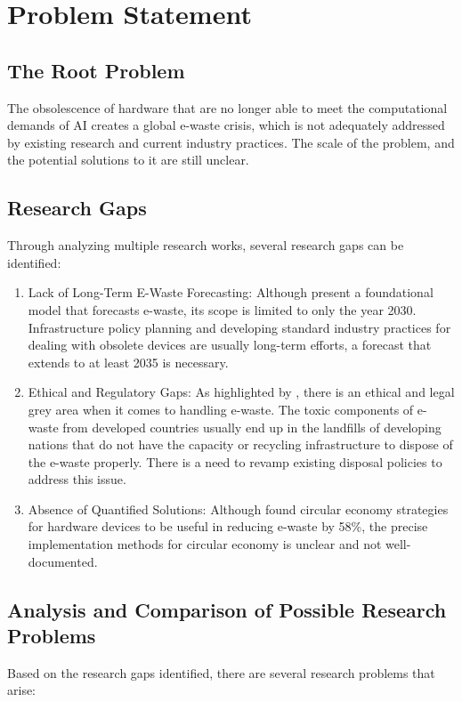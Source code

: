 \documentclass[a4paper, 12pt]{article}
\begin{document}
\section{Problem Statement}
\subsection*{The Root Problem}
The obsolescence of hardware that are no longer able to meet the computational demands of AI creates a global e-waste crisis, which is not adequately addressed by existing research and current industry practices. The scale of the problem, and the potential solutions to it are still unclear.

\subsection*{Research Gaps}
Through analyzing multiple research works, several research gaps can be identified: 
\begin{enumerate} 
	\item Lack of Long-Term E-Waste Forecasting: Although \citet{wang_2024_ewaste} present a foundational model that forecasts e-waste, its scope is limited to only the year 2030. Infrastructure policy planning and developing standard industry practices for dealing with obsolete devices are usually long-term efforts, a forecast that extends to at least 2035 is necessary. 
	
	\item Ethical and Regulatory Gaps: As highlighted by \citet{Zhuk2023}, there is an ethical and legal grey area when it comes to handling e-waste. The toxic components of e-waste from developed countries usually end up in the landfills of developing nations that do not have the capacity or recycling infrastructure to dispose of the e-waste properly. There is a need to revamp existing disposal policies to address this issue.
	
	\item Absence of Quantified Solutions: Although \citet{wang_2024_ewaste} found circular economy strategies for hardware devices to be useful in reducing e-waste by 58\%, the precise implementation methods for circular economy is unclear and not well-documented.
\end{enumerate}

\subsection*{Analysis and Comparison of Possible Research Problems}
Based on the research gaps identified, there are several research problems that arise: 
\end{document}
